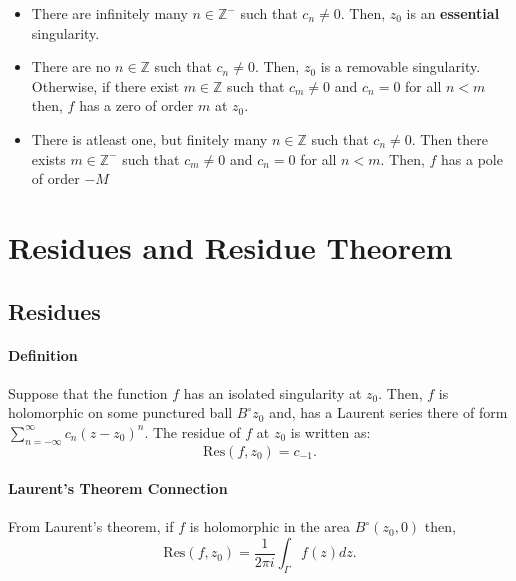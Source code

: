 \documentclass[12pt, letterpaper]{article}
\begin{document}
    \begin{itemize}
        \item There are infinitely many \(n\in \mathbb{Z}^-\) such that \(c_n \neq 0\).
        Then, \(z_0\) is an \textbf{essential} singularity.
        \item There are no \(n\in \mathbb{Z}\) such that \(c_n \neq 0\).
        Then, \(z_0\) is a removable singularity. Otherwise, if there exist
        \(m\in \mathbb{Z}\) such that \(c_m \neq 0\) and \(c_n = 0\)
        for all \(n < m\) then, \(f\) has a zero of order \(m\) at \(z_0\).
        \item There is atleast one, but finitely many \(n\in \mathbb{Z}\)
        such that \(c_n \neq 0\). Then there exists \(m\in \mathbb{Z}^-\)
        such that \(c_m \neq 0\) and \(c_n = 0\) for all \(n < m\).
        Then, \(f\) has a pole of order \(-M \)
    \end{itemize}


    \section{Residues and Residue Theorem}
    \subsection{Residues}
    
    \paragraph{Definition}
    Suppose that the function \(f\) has an isolated singularity at \(z_0.\)
    Then, \(f\) is holomorphic on some punctured ball \(B^\circ z_0\)
    and, has a Laurent series there of form 
    \(\sum_{n=-\infty}^{\infty} c_n (z-z_0)^n\). The residue of \(f\) at \(z_0\)
    is written as:
    \[\mathrm{Res}(f, z_0) = c_{-1}. \]

    \paragraph{Laurent's Theorem Connection}
    From Laurent's theorem, if \(f\) is holomorphic in the area
    \(B^\circ (z_0, 0)\)
    then, 
    \[ \mathrm{Res}(f, z_0) = \frac{1}{2\pi i} \int_\Gamma f(z)dz.\]
\end{document}
